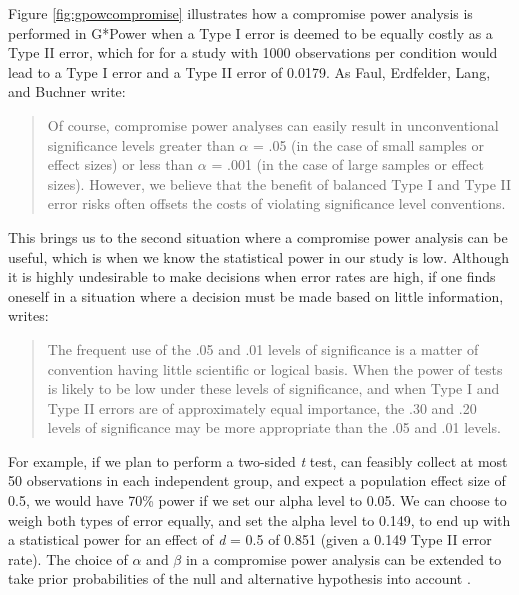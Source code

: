 \documentclass[
]{krantz}
\begin{document}
Figure \ref{fig:gpowcompromise} illustrates how a compromise power analysis is performed in G*Power when a Type I error is deemed to be equally costly as a Type II error, which for for a study with 1000 observations per condition would lead to a Type I error and a Type II error of 0.0179. As Faul, Erdfelder, Lang, and Buchner \citeyearpar{faul_gpower_2007} write:

\begin{quote}
Of course, compromise power analyses can easily result in unconventional significance levels greater than \(\alpha\) = .05 (in the case of small samples or effect sizes) or less than \(\alpha\) = .001 (in the case of large samples or effect sizes). However, we believe that the benefit of balanced Type I and Type II error risks often offsets the costs of violating significance level conventions.
\end{quote}

This brings us to the second situation where a compromise power analysis can be useful, which is when we know the statistical power in our study is low. Although it is highly undesirable to make decisions when error rates are high, if one finds oneself in a situation where a decision must be made based on little information, \citet{winer_statistical_1962} writes:

\begin{quote}
The frequent use of the .05 and .01 levels of significance is a matter of convention having little scientific or logical basis. When the power of tests is likely to be low under these levels of significance, and when Type I and Type II errors are of approximately equal importance, the .30 and .20 levels of significance may be more appropriate than the .05 and .01 levels.
\end{quote}

For example, if we plan to perform a two-sided \emph{t} test, can feasibly collect at most 50 observations in each independent group, and expect a population effect size of 0.5, we would have 70\% power if we set our alpha level to 0.05. We can choose to weigh both types of error equally, and set the alpha level to 0.149, to end up with a statistical power for an effect of \emph{d} = 0.5 of 0.851 (given a 0.149 Type II error rate). The choice of \(\alpha\) and \(\beta\) in a compromise power analysis can be extended to take prior probabilities of the null and alternative hypothesis into account \citep{maier_justify_2022, murphy_statistical_2014, miller_quest_2019}.
\end{document}
